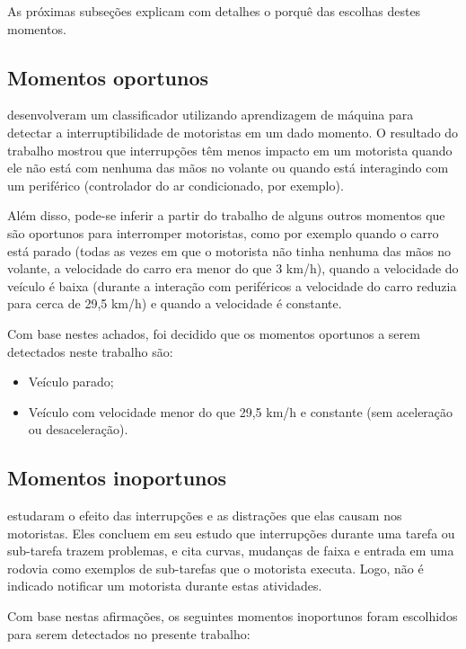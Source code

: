 As próximas subseções explicam com detalhes o porquê das escolhas destes momentos.

\subsection{Momentos oportunos}
\label{subsec-momentos-oportunos}

 desenvolveram um classificador utilizando aprendizagem de máquina para detectar a interruptibilidade
de motoristas em um dado momento. O resultado do trabalho mostrou que interrupções têm menos impacto em um motorista quando ele
não está com nenhuma das mãos no volante ou quando está interagindo com um periférico (controlador do ar condicionado, por exemplo).

Além disso, pode-se inferir a partir do trabalho de  alguns outros momentos que são oportunos para
interromper motoristas, como por exemplo quando o carro está parado (todas as vezes em que o motorista não tinha nenhuma das
mãos no volante, a velocidade do carro era menor do que 3 km/h), quando a velocidade do veículo é baixa (durante a interação com
periféricos a velocidade do carro reduzia para cerca de 29,5 km/h) e quando a velocidade é constante.

Com base nestes achados, foi decidido que os momentos oportunos a serem detectados neste trabalho são:

\begin{itemize}
  \item Veículo parado;
  \item Veículo com velocidade menor do que 29,5 km/h e constante (sem aceleração ou desaceleração).
\end{itemize}

\subsection{Momentos inoportunos}
\label{subsec-momentos-inoportunos}

 estudaram o efeito das interrupções e as distrações que elas causam nos motoristas.
Eles concluem em seu estudo que interrupções durante uma tarefa ou sub-tarefa trazem problemas, e cita curvas, mudanças
de faixa e entrada em uma rodovia como exemplos de sub-tarefas que o motorista executa. Logo, não é indicado notificar
um motorista durante estas atividades.

Com base nestas afirmações, os seguintes momentos inoportunos foram escolhidos para serem detectados no presente trabalho:

